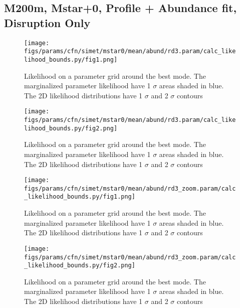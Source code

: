 \documentclass[twocolumn]{article}
\begin{document}


\subsection{M200m, Mstar+0, Profile + Abundance fit, Disruption Only}
\begin{figure}[H]
  \center\texttt{[image: figs/params/cfn/simet/mstar0/mean/abund/rd3.param/calc\_likelihood\_bounds.py/fig1.png]}
  \caption{Likelihood on a parameter grid around the best mode. The marginalized parameter likelihood have
    1 $\sigma$ areas shaded in blue. The 2D likelihood distributions have 1 $\sigma$  and 2 $\sigma$ contours}
  \label{fig:basic_rd:likelihood}
\end{figure}

\begin{figure}[H]
  \center\texttt{[image: figs/params/cfn/simet/mstar0/mean/abund/rd3.param/calc\_likelihood\_bounds.py/fig2.png]}
  \caption{Likelihood on a parameter grid around the best mode. The marginalized parameter likelihood have
    1 $\sigma$ areas shaded in blue. The 2D likelihood distributions have 1 $\sigma$  and 2 $\sigma$ contours}
  \label{fig:basic_rd:likelihood}
\end{figure}

\begin{figure}[H]
  \center\texttt{[image: figs/params/cfn/simet/mstar0/mean/abund/rd3\_zoom.param/calc\_likelihood\_bounds.py/fig1.png]}
  \caption{Likelihood on a parameter grid around the best mode. The marginalized parameter likelihood have
    1 $\sigma$ areas shaded in blue. The 2D likelihood distributions have 1 $\sigma$  and 2 $\sigma$ contours}
  \label{fig:basic_rd:likelihood}
\end{figure}

\begin{figure}[H]
  \center\texttt{[image: figs/params/cfn/simet/mstar0/mean/abund/rd3\_zoom.param/calc\_likelihood\_bounds.py/fig2.png]}
  \caption{Likelihood on a parameter grid around the best mode. The marginalized parameter likelihood have
    1 $\sigma$ areas shaded in blue. The 2D likelihood distributions have 1 $\sigma$  and 2 $\sigma$ contours}
  \label{fig:basic_rd:likelihood}
\end{figure}
\end{document}

